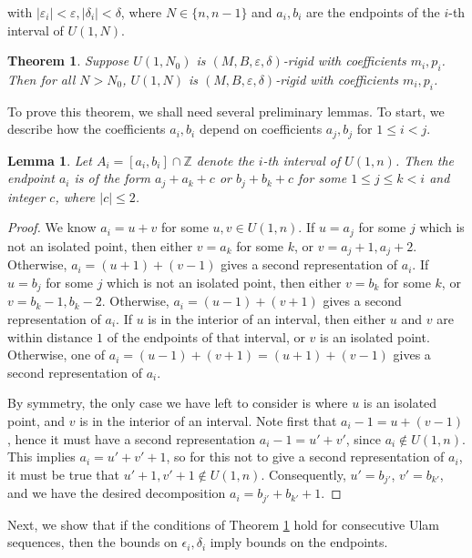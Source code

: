 \documentclass{amsart}
\newcommand{\ZZ}{\mathbb{Z}}
\theoremstyle{theorem}
\newtheorem{theorem}{Theorem}[section]
\newtheorem{lemma}{Lemma}[section]
\theoremstyle{definition}
\begin{document}
\noindent with $|\varepsilon_i| < \varepsilon, |\delta_i| < \delta$, where $N \in \{n, n - 1\}$ and $a_i, b_i$ are the endpoints of the $i$-th interval of $U(1,N)$.

\begin{theorem}\label{Rigidity for a=1}
Suppose $U(1,N_0)$ is $(M,B,\varepsilon,\delta)$-rigid with coefficients $m_i, p_i$. Then for all $N > N_0$, $U(1,N)$ is $(M,B,\varepsilon,\delta)$-rigid with coefficients $m_i, p_i$.
\end{theorem}

To prove this theorem, we shall need several preliminary lemmas. To start, we describe how the coefficients $a_i, b_i$ depend on coefficients $a_j, b_j$ for $1 \leq i < j$.

\begin{lemma}\label{RecursiveIntervals}
Let $A_i = [a_i,b_i] \cap \ZZ$ denote the $i$-th interval of $U(1,n)$. Then the endpoint $a_i$ is of the form $a_j + a_k + c$ or $ b_j + b_k + c$ for some $1 \leq j \leq k < i$ and integer $c$, where $|c| \leq 2$.
\end{lemma}

\begin{proof}
We know $a_i = u + v$ for some $u,v \in U(1,n)$. If $u = a_j$ for some $j$ which is not an isolated point, then either $v = a_k$ for some $k$, or $v = a_j + 1, a_j + 2$. Otherwise, $a_i = (u + 1) + (v - 1)$ gives a second representation of $a_i$. If $u = b_j$ for some $j$ which is not an isolated point, then either $v = b_k$ for some $k$, or $v = b_k - 1, b_k - 2$. Otherwise, $a_i = (u - 1) + (v + 1)$ gives a second representation of $a_i$. If $u$ is in the interior of an interval, then either $u$ and $v$ are within distance $1$ of the endpoints of that interval, or $v$ is an isolated point. Otherwise, one of $a_i = (u - 1) + (v + 1) = (u + 1) + (v - 1)$ gives a second representation of $a_i$.

By symmetry, the only case we have left to consider is where $u$ is an isolated point, and $v$ is in the interior of an interval. Note first that $a_i - 1 = u + (v - 1)$, hence it must have a second representation $a_i - 1 = u' + v'$, since $a_i \notin U(1,n)$. This implies $a_i = u' + v' + 1$, so for this not to give a second representation of $a_i$, it must be true that $u' + 1, v' + 1 \notin U(1,n)$. Consequently, $u' = b_{j'}$, $v' = b_{k'}$, and we have the desired decomposition $a_i = b_{j'} + b_{k'} + 1$.
\end{proof}

Next, we show that if the conditions of Theorem \ref{Rigidity for a=1} hold for consecutive Ulam sequences, then the bounds on $\epsilon_i, \delta_i$ imply bounds on the endpoints.
\end{document}
